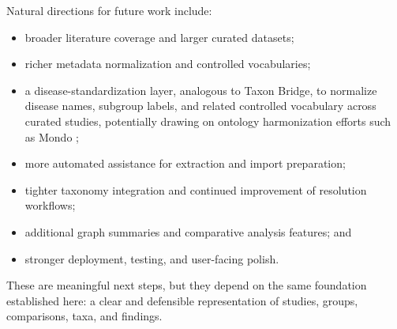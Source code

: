 Natural directions for future work include:

\begin{itemize}[leftmargin=1.5em]
    \item broader literature coverage and larger curated datasets;
    \item richer metadata normalization and controlled vocabularies;
    \item a disease-standardization layer, analogous to Taxon Bridge, to normalize disease names, subgroup labels, and related controlled vocabulary across curated studies, potentially drawing on ontology harmonization efforts such as Mondo \citep{vasilevsky2025mondo};
    \item more automated assistance for extraction and import preparation;
    \item tighter taxonomy integration and continued improvement of resolution workflows;
    \item additional graph summaries and comparative analysis features; and
    \item stronger deployment, testing, and user-facing polish.
\end{itemize}

These are meaningful next steps, but they depend on the same foundation established here: a clear and defensible representation of studies, groups, comparisons, taxa, and findings.
